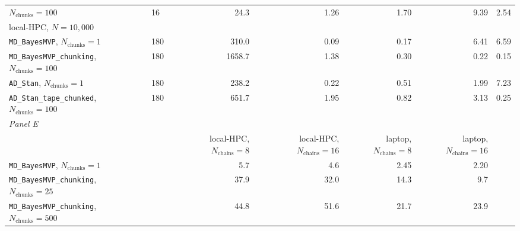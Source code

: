 \begin{table}[H]
{\begin{tabular}{llrrrrr}
$N_{\text{chunks}} = 100$ & 16 & 24.3 & 1.26 & 1.70 & 9.39 & 2.54 \\
\multicolumn{7}{l}{local-HPC, $N{=}10,000$} \\
\texttt{MD\_BayesMVP}, $N_{\text{chunks}} = 1$ & 180 & 310.0 & 0.09 & 0.17 & 6.41 & 6.59 \\
\makecell[tl]{\texttt{MD\_BayesMVP\_chunking}, \\ $N_{\text{chunks}} = 100$} & 180 & 1658.7 & 1.38 & 0.30 & 0.22 & 0.15 \\
\texttt{AD\_Stan}, $N_{\text{chunks}} = 1$ & 180 & 238.2 & 0.22 & 0.51 & 1.99 & 7.23 \\
\makecell[tl]{\texttt{AD\_Stan\_tape\_chunked}, \\ $N_{\text{chunks}} = 100$} & 180 & 651.7 & 1.95 & 0.82 & 3.13 & 0.25 \\
\hline
\multicolumn{7}{l}{\textit{Panel E}} \\
 & & \makecell[r]{local-HPC, \\ $N_{\text{chains}} = 8$} & \makecell[r]{local-HPC, \\ $N_{\text{chains}} = 16$} & \makecell[r]{laptop, \\ $N_{\text{chains}} = 8$} & \makecell[r]{laptop, \\ $N_{\text{chains}} = 16$} & \\
\hline
\texttt{MD\_BayesMVP}, $N_{\text{chunks}} = 1$ & & 5.7 & 4.6 & 2.45 & 2.20 & \\
\makecell[tl]{\texttt{MD\_BayesMVP\_chunking}, \\ $N_{\text{chunks}} = 25$} & & 37.9 & 32.0 & 14.3 & 9.7 & \\
\makecell[tl]{\texttt{MD\_BayesMVP\_chunking}, \\ $N_{\text{chunks}} = 500$} & & 44.8 & 51.6 & 21.7 & 23.9 & \\

\end{tabular}}
\end{table}
